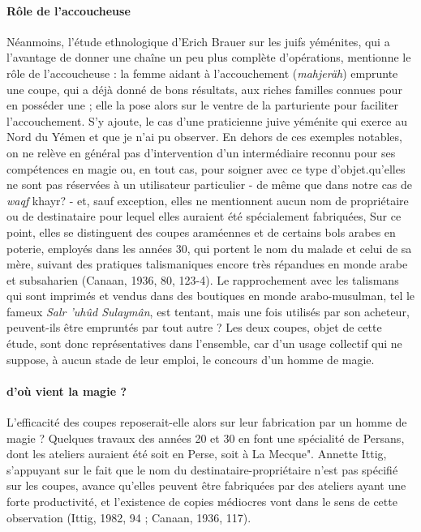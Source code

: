 \paragraph{Rôle de  l'accoucheuse}Néanmoins, l'étude ethnologique d'Erich Brauer sur les juifs yéménites, qui a l'avantage de donner une chaîne un peu plus complète d'opérations, mentionne le rôle de l'accoucheuse : la femme aidant à l'accouchement (\textit{mahjeräh}) emprunte une coupe, qui a déjà donné de bons résultats, aux riches familles connues pour en posséder une ; elle la pose alors sur le ventre de la parturiente pour faciliter l'accouchement. S'y ajoute, le cas d'une praticienne juive yéménite qui exerce au Nord du Yémen et que je n'ai pu observer.
En dehors de ces exemples notables, on ne relève en général pas d'intervention d'un intermédiaire reconnu pour ses compétences en magie ou, en tout cas, pour soigner avec ce type d'objet.qu'elles ne sont pas réservées à un utilisateur particulier - de même que dans notre cas de \textit{waqf} khayr? - et, sauf exception, elles ne mentionnent aucun nom de propriétaire ou de destinataire pour lequel elles auraient été spécialement fabriquées, Sur ce point, elles se distinguent des coupes araméennes et de certains bols arabes en poterie, employés dans les années 30, qui portent le nom du malade et celui de sa mère, suivant des pratiques talismaniques encore très répandues en monde arabe et subsaharien (Canaan, 1936, 80, 123-4). Le rapprochement avec les talismans qui sont imprimés et vendus dans des boutiques en monde arabo-musulman, tel le fameux \textit{Salr 'uhûd Sulaymân}, est tentant, mais une fois utilisés par son acheteur, peuvent-ils être empruntés par tout autre ? Les deux coupes, objet de cette étude, sont donc représentatives dans l'ensemble, car d'un usage collectif qui ne suppose, à aucun stade de leur emploi, le concours d'un homme de magie.
\paragraph{d'où vient la magie ?}
L'efficacité des coupes reposerait-elle alors sur leur fabrication par un homme de magie ? Quelques travaux des années 20 et 30 en font une spécialité de Persans, dont les ateliers auraient été soit en Perse, soit à La Mecque". Annette Ittig, s'appuyant sur le fait que le nom du destinataire-propriétaire n'est pas spécifié sur les coupes, avance qu'elles peuvent être fabriquées par des ateliers ayant une forte productivité, et l'existence de copies médiocres vont dans le sens de cette observation (Ittig, 1982, 94 ;
Canaan, 1936, 117). 
